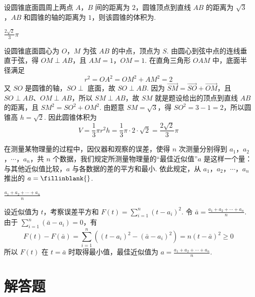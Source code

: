 \documentclass[UTF8,a4paper,oneside,11pt]{ctexbook}
\begin{document}
\begin{problem}
设圆锥底面圆周上两点 \(A\)，\(B\) 间的距离为 \(2\)，圆锥顶点到直线 \(AB\) 的距离为 \(\sqrt{3} \)，\(AB\) 和圆锥的轴的距离为 \(1\)，则该圆锥的体积为\fillinblank{}.
\end{problem}

\begin{answer}
\(\frac{2\sqrt{2}}{3}\pi\)
\end{answer}

\begin{solution}
设圆锥底面圆心为 \(O\)，\(M\) 为弦 \(AB\) 的中点，顶点为 \(S\). 由圆心到弦中点的连线垂直于弦，得 \(OM\perp AB\)，且 \(AM=1\)，\(OM=1\).
在直角三角形 \(OAM\) 中，底面半径满足
\[
r^2=OA^2=OM^2+AM^2=2
\]
又 \(SO\) 是圆锥的轴，\(SO\perp\) 底面，故 \(SO\perp AB\). 因为 \(\overrightarrow{SM}=\overrightarrow{SO}+\overrightarrow{OM}\)，且 \(SO\perp AB\)、\(OM\perp AB\)，所以 \(SM\perp AB\)，故 \(SM\) 就是题设给出的顶点到直线 \(AB\) 的距离，且 \(SM^2=SO^2+OM^2\).
由题意 \(SM=\sqrt{3}\)，得 \(SO^2=3-1=2\)，所以圆锥高 \(h=\sqrt{2}\). 因此圆锥体积为
\[
V=\frac13\pi r^2h=\frac13\pi\cdot2\cdot\sqrt{2}
=\frac{2\sqrt{2}}{3}\pi
\]
\end{solution}

\begin{problem}
在测量某物理量的过程中，因仪器和观察的误差，使得 \(n\) 次测量分别得到 \(a_{1}\)，\(a_{2}\)，\(\cdots\)，\(a_{n}\)，共 \(n\) 个数据，我们规定所测量物理量的“最佳近似值”\(a\) 是这样一个量：与其他近似值比较，\(a\) 与各数据的差的平方和最小. 依此规定，从 \(a_{1}\)，\(a_{2}\)，\(\cdots\)，\(a_{n}\) 推出的 \(a =\fillinblank{}\).
\end{problem}

\begin{answer}
\(\frac{a_1+a_2+\cdots+a_n}{n}\)
\end{answer}

\begin{solution}
设近似值为 \(t\)，考察误差平方和 \(F(t)=\sum_{i=1}^{n}(t-a_i)^2\). 令 \(\bar a=\frac{a_1+a_2+\cdots+a_n}{n}\).
由于 \(\sum_{i=1}^{n}(\bar a-a_i)=0\)，有
\[
F(t)-F(\bar a)
=\sum_{i=1}^{n}\left((t-a_i)^2-(\bar a-a_i)^2\right)
=n(t-\bar a)^2\geqslant0
\]
所以 \(F(t)\) 在 \(t=\bar a\) 时取得最小值，最佳近似值为 \(a=\frac{a_1+a_2+\cdots+a_n}{n}\).
\end{solution}

\section{解答题}
\end{document}
